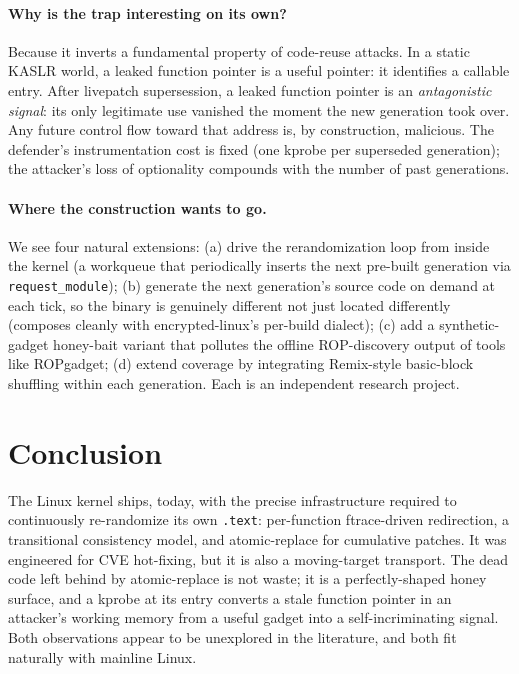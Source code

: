 \documentclass[10pt,letterpaper]{article}
\begin{document}
\paragraph{Why is the trap interesting on its own?} Because it
inverts a fundamental property of code-reuse attacks. In a static
KASLR world, a leaked function pointer is a useful pointer: it
identifies a callable entry. After livepatch supersession, a leaked
function pointer is an \emph{antagonistic signal}: its only legitimate
use vanished the moment the new generation took over. Any future
control flow toward that address is, by construction, malicious. The
defender's instrumentation cost is fixed (one kprobe per superseded
generation); the attacker's loss of optionality compounds with the
number of past generations.

\paragraph{Where the construction wants to go.} We see four natural
extensions: (a) drive the rerandomization loop from inside the kernel
(a workqueue that periodically inserts the next pre-built generation
via \texttt{request\_module}); (b) generate the next generation's
source code on demand at each tick, so the binary is genuinely
different not just located differently (composes cleanly with
encrypted-linux's per-build dialect); (c) add a synthetic-gadget
honey-bait variant that pollutes the offline ROP-discovery output of
tools like ROPgadget; (d) extend coverage by integrating Remix-style
\cite{remix} basic-block shuffling within each generation. Each is
an independent research project.

\section{Conclusion}
\label{sec:conclusion}

The Linux kernel ships, today, with the precise infrastructure
required to continuously re-randomize its own \texttt{.text}: per-function
ftrace-driven redirection, a transitional consistency model, and
atomic-replace for cumulative patches. It was engineered for CVE
hot-fixing, but it is also a moving-target transport. The dead code
left behind by atomic-replace is not waste; it is a perfectly-shaped
honey surface, and a kprobe at its entry converts a stale function
pointer in an attacker's working memory from a useful gadget into a
self-incriminating signal. Both observations appear to be unexplored
in the literature, and both fit naturally with mainline Linux.
\end{document}
